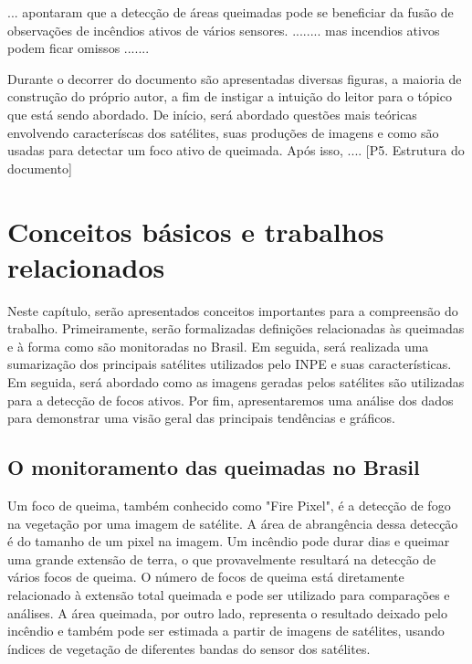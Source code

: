 \documentclass[cic,tc]{iiufrgs}
\begin{document}
... apontaram que a detecção de áreas queimadas pode se beneficiar da fusão de observações de incêndios ativos de vários sensores. \citep{giglio2010assessing} ........ mas incendios ativos podem ficar omissos \citep{giglio2009active} ....... \par

Durante o decorrer do documento são apresentadas diversas figuras, a maioria de construção do próprio autor, a fim de instigar a intuição do leitor para o tópico que está sendo abordado. De início, será abordado questões mais teóricas envolvendo caracteríscas dos satélites, suas produções de imagens e como são usadas para detectar um foco ativo de queimada. Após isso, .... [P5. Estrutura do documento] \par



\chapter{Conceitos básicos e trabalhos relacionados}

Neste capítulo, serão apresentados conceitos importantes para a compreensão do trabalho. Primeiramente, serão formalizadas definições relacionadas às queimadas e à forma como são monitoradas no Brasil. Em seguida, será realizada uma sumarização dos principais satélites utilizados pelo INPE e suas características. Em seguida, será abordado como as imagens geradas pelos satélites são utilizadas para a detecção de focos ativos. Por fim, apresentaremos uma análise dos dados para demonstrar uma visão geral das principais tendências e gráficos. \par

\section{O monitoramento das queimadas no Brasil}

Um foco de queima, também conhecido como "Fire Pixel", é a detecção de fogo na vegetação por uma imagem de satélite. A área de abrangência dessa detecção é do tamanho de um pixel na imagem. Um incêndio pode durar dias e queimar uma grande extensão de terra, o que provavelmente resultará na detecção de vários focos de queima. O número de focos de queima está diretamente relacionado à extensão total queimada e pode ser utilizado para comparações e análises. A área queimada, por outro lado, representa o resultado deixado pelo incêndio e também pode ser estimada a partir de imagens de satélites, usando índices de vegetação de diferentes bandas do sensor dos satélites. \par
\end{document}
